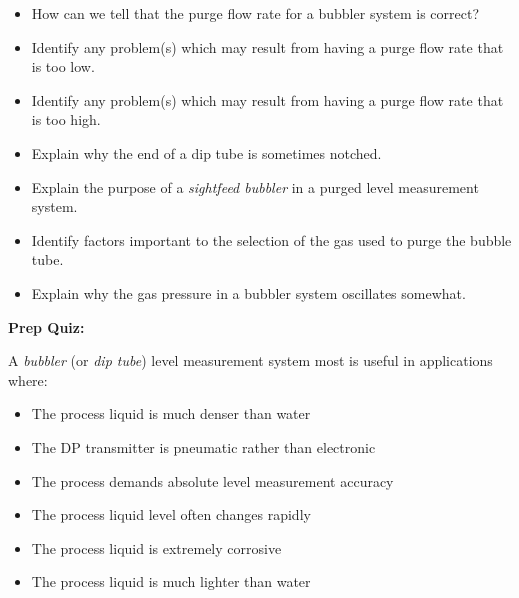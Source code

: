 \begin{itemize}
\item{} How can we tell that the purge flow rate for a bubbler system is correct?
\item{} Identify any problem(s) which may result from having a purge flow rate that is too low.
\item{} Identify any problem(s) which may result from having a purge flow rate that is too high.
\item{} Explain why the end of a dip tube is sometimes notched.
\item{} Explain the purpose of a {\it sightfeed bubbler} in a purged level measurement system.
\item{} Identify factors important to the selection of the gas used to purge the bubble tube.
\item{} Explain why the gas pressure in a bubbler system oscillates somewhat.
\end{itemize}
















\vfil \eject

\noindent
{\bf Prep Quiz:}

A {\it bubbler} (or {\it dip tube}) level measurement system most is useful in applications where:

\begin{itemize}
\item{} The process liquid is much denser than water
\vskip 5pt 
\item{} The DP transmitter is pneumatic rather than electronic
\vskip 5pt 
\item{} The process demands absolute level measurement accuracy
\vskip 5pt 
\item{} The process liquid level often changes rapidly
\vskip 5pt 
\item{} The process liquid is extremely corrosive
\vskip 5pt 
\item{} The process liquid is much lighter than water 
\end{itemize}




